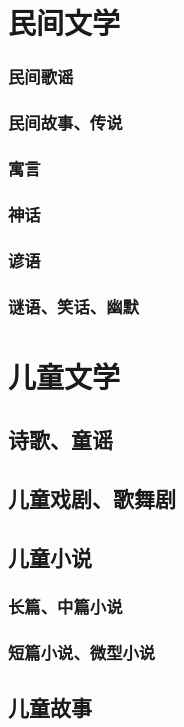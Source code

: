 \documentclass[UTF8]{../../RepresentationUniverse}
\begin{document}
\section{民间文学}
    \subsubsection{民间歌谣}
    \subsubsection{民间故事、传说}
    \subsubsection{寓言}
    \subsubsection{神话}
    \subsubsection{谚语}
    \subsubsection{谜语、笑话、幽默}



\section{儿童文学}
    \subsection{诗歌、童谣}
    \subsection{儿童戏剧、歌舞剧}
    \subsection{儿童小说}
        \subsubsection{长篇、中篇小说}
        \subsubsection{短篇小说、微型小说}
    \subsection{儿童故事}
\end{document}
